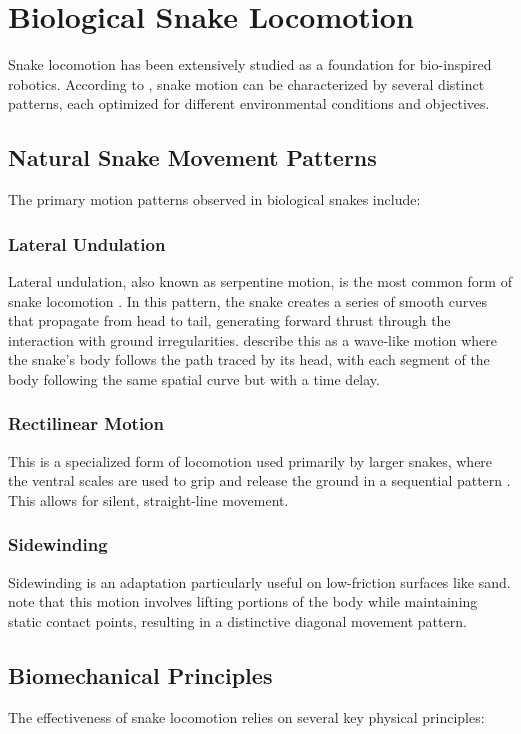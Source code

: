 \documentclass[12pt,a4paper]{report}
\begin{document}
\section{Biological Snake Locomotion}
Snake locomotion has been extensively studied as a foundation for bio-inspired robotics. According to \textcite{liljeback-2013}, snake motion can be characterized by several distinct patterns, each optimized for different environmental conditions and objectives.

\subsection{Natural Snake Movement Patterns}
The primary motion patterns observed in biological snakes include:

\subsubsection{Lateral Undulation}
Lateral undulation, also known as serpentine motion, is the most common form of snake locomotion \parencite{transeth-2009}. In this pattern, the snake creates a series of smooth curves that propagate from head to tail, generating forward thrust through the interaction with ground irregularities. \textcite{liljeback-2013} describe this as a wave-like motion where the snake's body follows the path traced by its head, with each segment of the body following the same spatial curve but with a time delay.

\subsubsection{Rectilinear Motion}
This is a specialized form of locomotion used primarily by larger snakes, where the ventral scales are used to grip and release the ground in a sequential pattern \parencite{transeth-2009}. This allows for silent, straight-line movement.

\subsubsection{Sidewinding}
Sidewinding is an adaptation particularly useful on low-friction surfaces like sand. \textcite{wang2020cpg} note that this motion involves lifting portions of the body while maintaining static contact points, resulting in a distinctive diagonal movement pattern.

\subsection{Biomechanical Principles}
The effectiveness of snake locomotion relies on several key physical principles:
\end{document}
